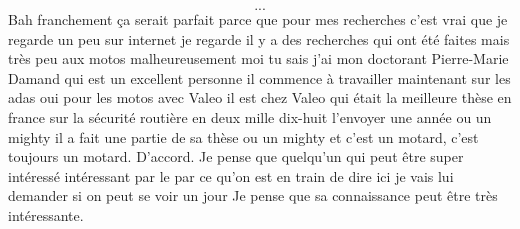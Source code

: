 \[...\]
\ifconfidentiel
Bah franchement ça serait parfait parce que pour mes recherches c'est vrai que je regarde un peu sur internet je regarde il y a des recherches qui ont été faites mais très peu aux motos malheureusement moi tu sais j'ai mon doctorant Pierre-Marie Damand qui est un excellent personne il commence à travailler maintenant sur les adas oui pour les motos avec Valeo il est chez Valeo qui était la meilleure thèse en france sur la sécurité routière en deux mille dix-huit l'envoyer une année ou un mighty il a fait une partie de sa thèse ou un mighty et c'est un motard, c'est toujours un motard. D'accord. Je pense que quelqu'un qui peut être super intéressé intéressant par le par ce qu'on est en train de dire ici je vais lui demander si on peut se voir un jour Je pense que sa connaissance peut être très intéressante.
\fi

